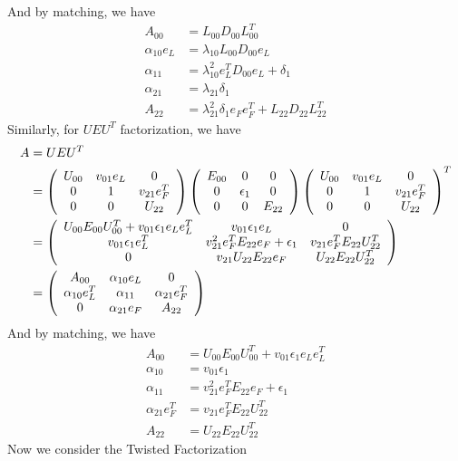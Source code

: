 \documentclass[11pt,a4paper]{article}
\begin{document}
And by matching, we have 
\begin{equation} \label{111}
    \begin{aligned}
    A_{00}  &= L_{00} D_{00} L_{00}^T  \\
   \alpha_{10} e_L  &= \lambda_{10} L_{00} D_{00} e_L \\
    \alpha_{11} &= \lambda_{10}^2 e_L^T D_{00} e_L + \delta_1 \\
    \alpha_{21} &= \lambda_{21} \delta_1\\
    A_{22} &= \lambda_{21}^2 \delta_1 e_F e_F^T + L_{22} D_{22} L_{22}^T
    \end{aligned}
\end{equation}
Similarly, for $UEU^T$ factorization, we have
\begin{align}
    A &= U E U^T \nonumber \\
      &= \left( \begin{array}{ccc} U_{00} & v_{01}e_L & 0 \\ 0 & 1 & v_{21} e_F^T \\ 0 & 0 & U_{22} \end{array} \right) \left( \begin{array}{ccc} E_{00} & 0 & 0 \\ 0 & \epsilon_1 & 0 \\ 0 & 0 & E_{22} \end{array} \right) \left( \begin{array}{ccc} U_{00} & v_{01}e_L & 0 \\ 0 & 1 & v_{21} e_F^T \\ 0 & 0 & U_{22} \end{array} \right)^T  \nonumber\\
      &= \left( \begin{array}{ccc}
              U_{00} E_{00} U_{00}^T + v_{01} \epsilon_{1} e_L e_L^T & v_{01} \epsilon_1 e_L & 0 \\
              v_{01} \epsilon_1 e_L^T & v_{21}^2 e_F^T E_{22} e_F + \epsilon_1 
        & v_{21} e_F^T E_{22} U_{22}^T \\
        0 & v_{21} U_{22} E_{22} e_F & U_{22} E_{22} U_{22}^T
    \end{array} \right) \\
    &= \left( \begin{array}{ccc} A_{00} & \alpha_{10} e_L & 0 \\ \alpha_{10} e_L^T & \alpha_{11} & \alpha_{21} e_F^T \\ 0 & \alpha_{21} e_F & A_{22} \end{array} \right)
\end{align}
And by matching, we have 
\begin{equation} \label{222}
    \begin{aligned}
    A_{00}  &= U_{00} E_{00} U_{00}^T + v_{01} \epsilon_{1} e_L e_L^T  \\
    \alpha_{10}  &= v_{01} \epsilon_1   \\
    \alpha_{11} &= v_{21}^2 e_F^T E_{22} e_F + \epsilon_1 \\
    \alpha_{21} e_F^T &= v_{21} e_F^T E_{22} U_{22}^T \\
    A_{22} &= U_{22} E_{22} U_{22}^T
\end{aligned}
\end{equation}
Now we consider the Twisted Factorization
\end{document}
